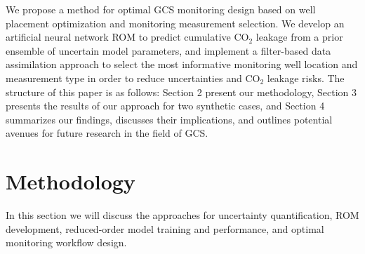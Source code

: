 \documentclass[a4paper,fleqn]{cas-sc}
\begin{document}
We propose a method for optimal GCS monitoring design based on well placement optimization and monitoring measurement selection. We develop an artificial neural network ROM to predict cumulative CO$_2$ leakage from a prior ensemble of uncertain model parameters, and implement a filter-based data assimilation approach to select the most informative monitoring well location and measurement type in order to reduce uncertainties and CO$_2$ leakage risks. The structure of this paper is as follows: Section 2 present our methodology, Section 3 presents the results of our approach for two synthetic cases, and Section 4 summarizes our findings, discusses their implications, and outlines potential avenues for future research in the field of GCS.

\section{Methodology}
In this section we will discuss the approaches for uncertainty quantification, ROM development, reduced-order model training and performance, and optimal monitoring workflow design.
\end{document}
